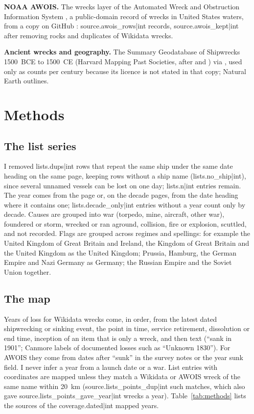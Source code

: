 \documentclass[11pt,a4paper]{article}
\begin{document}
\textbf{NOAA AWOIS.} The wrecks layer of the Automated Wreck and Obstruction Information System \citep{awois}, a public-domain record of wrecks in United States waters, from a copy on GitHub \citep{awoisgh}: {{source.awois_rows|int}} records, {{source.awois_kept|int}} after removing rocks and duplicates of Wikidata wrecks.

\textbf{Ancient wrecks and geography.} The Summary Geodatabase of Shipwrecks 1500~BCE to 1500~CE (Harvard Mapping Past Societies, after \citealt{strauss} and \citealt{parker}) via \citet{ancientgh}, used only as counts per century because its licence is not stated in that copy; Natural Earth \citep{naturalearth} outlines.

\section{Methods}
\subsection{The list series}
I removed {{lists.dups|int}} rows that repeat the same ship under the same date heading on the same page, keeping rows without a ship name ({{lists.no_ship|int}}), since several unnamed vessels can be lost on one day; {{lists.n|int}} entries remain. The year comes from the page or, on the decade pages, from the date heading where it contains one; {{lists.decade_only|int}} entries without a year count only by decade. Causes are grouped into war (torpedo, mine, aircraft, other war), foundered or storm, wrecked or ran aground, collision, fire or explosion, scuttled, and not recorded. Flags are grouped across regimes and spellings: for example the United Kingdom of Great Britain and Ireland, the Kingdom of Great Britain and the United Kingdom as the United Kingdom; Prussia, Hamburg, the German Empire and Nazi Germany as Germany; the Russian Empire and the Soviet Union together.

\subsection{The map}
Years of loss for Wikidata wrecks come, in order, from the latest dated shipwrecking or sinking event, the point in time, service retirement, dissolution or end time, inception of an item that is only a wreck, and then text (``sank in 1901''; Canmore labels of documented losses such as ``Unknown 1830''). For AWOIS they come from dates after ``sunk'' in the survey notes or the year sunk field. I never infer a year from a launch date or a war. List entries with coordinates are mapped unless they match a Wikidata or AWOIS wreck of the same name within 20~km ({{source.lists_points_dup|int}} such matches, which also gave {{source.lists_points_gave_year|int}} wrecks a year). Table~\ref{tab:methods} lists the sources of the {{coverage.dated|int}} mapped years.
\end{document}
